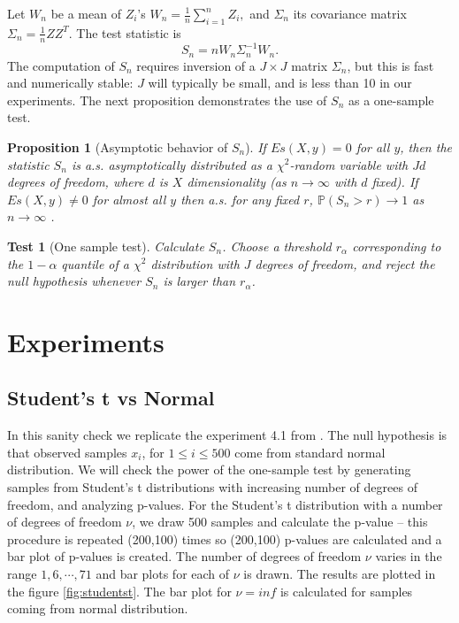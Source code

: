 \documentclass{article}
\newtheorem{test}{Test}
\newtheorem{proposition}{Proposition}
\begin{document}
Let $W_n$ be a mean of $Z_i$'s
$W_n = \frac 1  n \sum_{i=1}^n Z_i, $
and $\Sigma_n$ its  covariance matrix
$\Sigma_n = \frac 1  n Z Z^{T}$.
The test statistic is
\begin{equation}
 S_n = n W_n \Sigma_n^{-1} W_n.
\end{equation}
The computation of $S_n$ requires inversion of a $J\times J$ matrix $\Sigma_n$, but this is fast and numerically stable: $J$ will typically be small, and is less than 10 in our experiments. The next proposition demonstrates the use of $S_n$ as a one-sample test.
\begin{proposition}[Asymptotic behavior of $S_n$]
\label{prop:Hotelling}
 If  $E s(X,y)=0$ for all $y$, then the statistic $S_n$ is a.s. asymptotically distributed as a $\chi^2$-random variable with $Jd$ degrees of freedom, where $d$ is $X$ dimensionality (as $n \to \infty$ with $d$ fixed). If  $E s(X,y) \neq 0$ for almost all $y$ then a.s. for any fixed $r$, $\mathbb P(S_n > r) \to 1$  as $n \to \infty$ .
\end{proposition}


\begin{test}[One sample test]
\label{test}
Calculate $S_n$. Choose a threshold $r_\alpha$ corresponding to the $1-\alpha$ quantile of a  $\chi^2$ distribution with $J$ degrees of freedom, and reject the null hypothesis whenever $S_n$ is larger than $r_\alpha$. 
\end{test}

\section{Experiments}

\subsection{Student's t vs Normal}
In this  sanity check we replicate the experiment 4.1 from \cite{gorham2015measuring}. The null hypothesis is that observed samples $x_i$, for $1 \leq i \leq 500$ come from standard normal distribution. We will check the power of the one-sample test by generating samples from Student's t distributions with increasing number of degrees of freedom, and analyzing p-values. For the Student's t distribution with a number of degrees of freedom $\nu$, we draw 500 samples and calculate the p-value -- this procedure is repeated (200,100) times so (200,100) p-values are calculated and a bar plot of p-values is created. The number of degrees of freedom $\nu$ varies in the range $1,6,\cdots,71$ and bar plots for each of $\nu$ is drawn.  The results are plotted in the figure \ref{fig:studentst}. The bar plot for $\nu = inf$ is calculated for samples coming from normal distribution.
\end{document}
